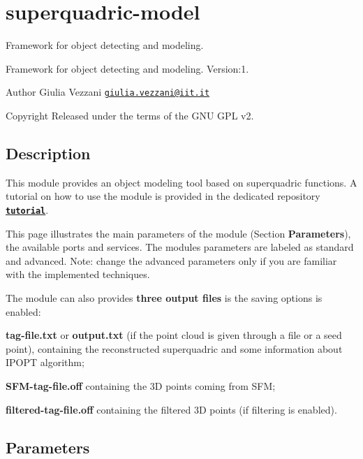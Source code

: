\section{superquadric-\/model}
\label{group__superquadric-model}


Framework for object detecting and modeling.  


Framework for object detecting and modeling. Version\-:1. \begin{DoxyAuthor}{Author}
Giulia Vezzani \href{mailto:giulia.vezzani@iit.it}{\tt giulia.\-vezzani@iit.\-it} \par
 
\end{DoxyAuthor}
\begin{DoxyCopyright}{Copyright}
Released under the terms of the G\-N\-U G\-P\-L v2. 
\end{DoxyCopyright}
\hypertarget{group__superquadric-model_intro_sec}{}\subsection{Description}\label{group__superquadric-model_intro_sec}
This module provides an object modeling tool based on superquadric functions. A tutorial on how to use the module is provided in the dedicated repository \href{https://github.com/robotology/superquadric-model/tree/master/tutorial}{\tt {\bfseries tutorial}}.

This page illustrates the main parameters of the module (Section {\bfseries Parameters}), the available ports and services. The modules parameters are labeled as standard and advanced. Note\-: change the advanced parameters only if you are familiar with the implemented techniques.

The module can also provides {\bfseries three output files} is the saving options is enabled\-:
\begin{DoxyItemize}
\item {\bfseries tag-\/file.\-txt} or {\bfseries output.\-txt} (if the point cloud is given through a file or a seed point), containing the reconstructed superquadric and some information about I\-P\-O\-P\-T algorithm;
\item {\bfseries S\-F\-M-\/tag-\/file.\-off} containing the 3\-D points coming from S\-F\-M;
\item {\bfseries filtered-\/tag-\/file.\-off} containing the filtered 3\-D points (if filtering is enabled).
\end{DoxyItemize}\hypertarget{group__superquadric-model_parameters_sec}{}\subsection{Parameters}\label{group__superquadric-model_parameters_sec}

